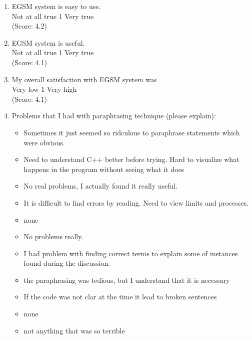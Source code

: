 \begin{enumerate}
\item EGSM system is easy to use.
\\
Not at all true \hfill 1     \hfill Very true\\
(Score: 4.2)


\item EGSM system is useful.
\\
Not at all true \hfill 1     \hfill Very true\\
(Score: 4.1)

\item My overall satisfaction with EGSM system was
\\
Very low \hfill 1     \hfill Very high\\
(Score: 4.1)


\item Problems that I had with paraphrasing technique (please
explain):
\begin{itemize}
\item Sometimes it just seemed so ridculous to paraphrase statements which
were obvious.
\item Need to understand C++ better before trying.  Hard to visualize what
happens in the program without seeing what it does
\item No real problems, I actually found it really useful.
\item It is difficult to find errors by reading.  Need to view limits and
processes.

\item none
\item No problems really.

\item I had problem with finding correct terms to explain some of instances
found during the discussion.

\item the paraphrasing was tedious, but I understand that it is necessary
\item If the code was not clar at the time it lead to broken sentences

\item none

\item not anything that was so terrible
\end{itemize}



\end{enumerate}
